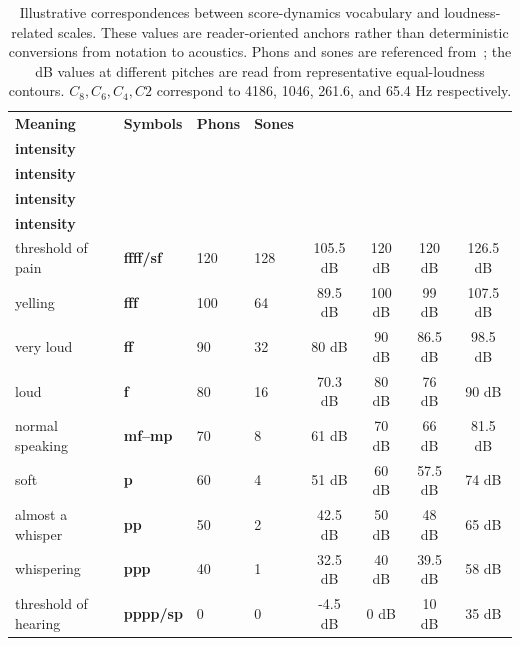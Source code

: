 \begin{table}[h!]
\centering
\caption{Illustrative correspondences between score-dynamics vocabulary and loudness-related scales. These values are reader-oriented anchors rather than deterministic conversions from notation to acoustics. Phons and sones are referenced from~\cite{backus1977acoustical}; the dB values at different pitches are read from representative equal-loudness contours. $C_8, C_6, C_4, C2$ correspond to 4186, 1046, 261.6, and 65.4 Hz respectively.}
\label{tab:dynamics_symbols}
\setlength{\tabcolsep}{2.4pt}
\fontsize{11pt}{11pt}\selectfont
\renewcommand{\arraystretch}{1.2}
\begin{tabular}{llll cccc}
\toprule
\textbf{Meaning} &
\textbf{Symbols} &
\textbf{Phons} &
\textbf{Sones} &
\makecell{\textbf{4186 Hz} \\ \textbf{intensity}} &
\makecell{\textbf{1046 Hz} \\ \textbf{intensity}} &
\makecell{\textbf{261.6 Hz} \\ \textbf{intensity}} &
\makecell{\textbf{65.4 Hz} \\ \textbf{intensity}} \\
\midrule
threshold of pain    & \textbf{ffff/sf} & 120 & 128 & 105.5 dB & 120 dB & 120 dB & 126.5 dB \\
yelling              & \textbf{fff}   & 100 & 64  & 89.5 dB  & 100 dB & 99 dB  & 107.5 dB \\
very loud            & \textbf{ff}    & 90  & 32  & 80 dB    & 90 dB  & 86.5 dB & 98.5 dB \\
loud                 & \textbf{f}     & 80  & 16  & 70.3 dB  & 80 dB  & 76 dB  & 90 dB \\
normal speaking      & \textbf{mf--mp}& 70  & 8   & 61 dB    & 70 dB  & 66 dB  & 81.5 dB \\
soft                 & \textbf{p}     & 60  & 4   & 51 dB    & 60 dB  & 57.5 dB & 74 dB \\
almost a whisper     & \textbf{pp}    & 50  & 2   & 42.5 dB  & 50 dB  & 48 dB  & 65 dB \\
whispering           & \textbf{ppp}   & 40  & 1   & 32.5 dB  & 40 dB  & 39.5 dB & 58 dB \\
threshold of hearing & \textbf{pppp/sp} & 0   & 0   & -4.5 dB  & 0 dB   & 10 dB  & 35 dB \\
\bottomrule
\end{tabular}
\end{table}
